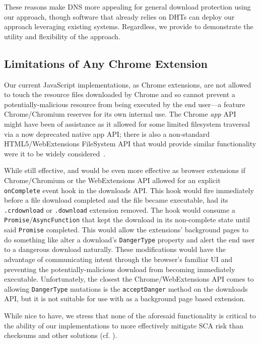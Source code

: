 These reasons make DNS more appealing for general download protection using our
approach, though software that already relies on DHTs can deploy our approach
leveraging existing systems. Regardless, we provide \DHTSYS{} to demonstrate the
utility and flexibility of the \SYSTEM{} approach.

\subsection{Limitations of Any Chrome Extension}

Our current JavaScript implementations, as Chrome extensions, are not allowed to
touch the resource files downloaded by Chrome and so cannot prevent a
potentially-malicious resource from being executed by the end user---a feature
Chrome/Chromium reserves for its own internal use. The Chrome \textit{app}
API~\cite{AppAPI} might have been of assistance as it allowed for some limited
filesystem traversal via a now deprecated native app API; there is also a
non-standard HTML5/WebExtensions FileSystem API that would provide similar
functionality were it to be widely considered~\cite{deadSpec}.

While still effective, \DNSSYS{} and \DHTSYS{} would be even more effective as
browser extensions if Chrome/Chromium or the WebExtensions API allowed for an
explicit \texttt{onComplete} event hook in the downloads API. This hook would
fire immediately before a file download completed and the file became
executable, \ie had its \texttt{.crdownload} or \texttt{.download} extension
removed. The hook would consume a \texttt{Promise}/\texttt{AsyncFunction} that
kept the download in its non-complete state until said \texttt{Promise}
completed. This would allow the extensions' background pages to do something
like alter a download's \texttt{DangerType} property and alert the end user to a
dangerous download naturally. These modifications would have the advantage of
communicating intent through the browser's familiar UI and preventing the
potentially-malicious download from becoming immediately executable.
Unfortunately, the closest the Chrome/WebExtensions API comes to allowing
\texttt{DangerType} mutations is the \texttt{acceptDanger} method on the
downloads API, but it is not suitable for use with \DNSSYS{} as a background
page based extension.

While nice to have, we stress that none of the aforesaid functionality is
critical to the ability of our implementations to more effectively mitigate SCA
risk than checksums and other solutions (cf. ).
